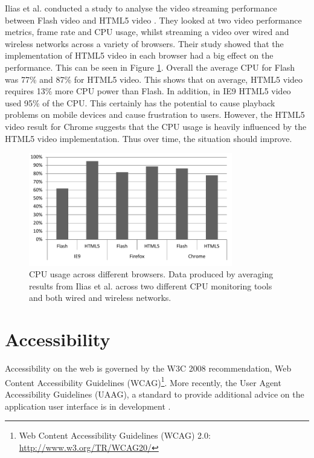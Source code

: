 \documentclass[journal]{IEEEtran}
\begin{document}
Ilias et al. conducted a study to analyse the video streaming performance between Flash video and HTML5 video \cite{inproceedings:aStudyOfVideoPerformanceAnalysis}. They looked at two video performance metrics, frame rate and CPU usage, whilst streaming a video over wired and wireless networks across a variety of browsers. Their study showed that the implementation of HTML5 video in each browser had a big effect on the performance. This can be seen in Figure \ref{fig:cpuPerformanceGraph}. Overall the average CPU for Flash was 77\% and 87\% for HTML5 video. This shows that on average, HTML5 video requires 13\% more CPU power than Flash. In addition, in IE9 HTML5 video used 95\% of the CPU. This certainly has the potential to cause playback problems on mobile devices and cause frustration to users. However, the HTML5 video result for Chrome suggests that the CPU usage is heavily influenced by the HTML5 video implementation. Thus over time, the situation should improve.


\begin{figure}[!t]
\centering
\includegraphics[width=3.5in]{cpu-performance-graph}
\caption{CPU usage across different browsers. Data produced by averaging results from Ilias et al. \cite{inproceedings:aStudyOfVideoPerformanceAnalysis} across two different CPU monitoring tools and both wired and wireless networks.}
\label{fig:cpuPerformanceGraph}
\end{figure} 

\section{Accessibility}
Accessibility on the web is governed by the W3C 2008 recommendation, Web Content Accessibility Guidelines (WCAG)\footnote{Web Content Accessibility Guidelines (WCAG) 2.0: \url{http://www.w3.org/TR/WCAG20/}}. More recently, the User Agent Accessibility Guidelines (UAAG), a standard to provide additional advice on the application user interface is in development \cite{website:implementingUAAG}.
\end{document}
